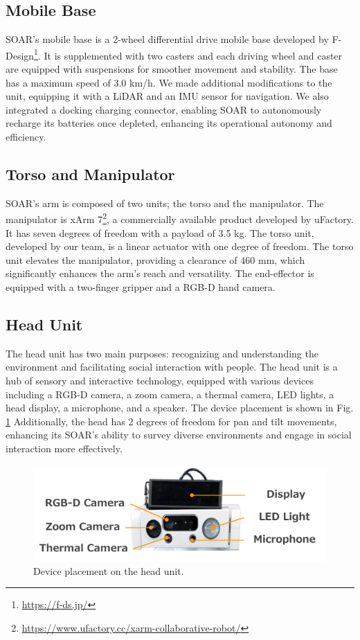 \documentclass[runningheads,a4paper]{llncs}
\begin{document}
\subsection{Mobile Base}
SOAR’s mobile base is a 2-wheel differential drive mobile base developed by F-Design\footnote{\url{https://f-ds.jp/}}.
It is supplemented with two casters and each driving wheel and caster are equipped with suspensions for smoother movement and stability.
The base has a maximum speed of 3.0 km/h.
We made additional modifications to the unit, equipping it with a LiDAR and an IMU sensor for navigation.
We also integrated a docking charging connector, enabling SOAR to autonomously recharge its batteries once depleted, enhancing its operational autonomy and efficiency.

\subsection{Torso and Manipulator}
SOAR’s arm is composed of two units; the torso and the manipulator.
The manipulator is xArm 7\footnote{\url{https://www.ufactory.cc/xarm-collaborative-robot/}}, a commercially available product developed by uFactory.
It has seven degrees of freedom with a payload of 3.5 kg.
The torso unit, developed by our team, is a linear actuator with one degree of freedom.
The torso unit elevates the manipulator, providing a clearance of 460 mm, which significantly enhances the arm’s reach and versatility.
The end-effector is equipped with a two-finger gripper and a RGB-D hand camera.

\subsection{Head Unit}
The head unit has two main purposes: recognizing and understanding the environment and facilitating social interaction with people.
The head unit is a hub of sensory and interactive technology, equipped with various devices including a RGB-D camera, a zoom camera, a thermal camera, LED lights, a head display, a microphone, and a speaker.
The device placement is shown in Fig. \ref{fig:head}
Additionally, the head has 2 degrees of freedom for pan and tilt movements, enhancing its SOAR’s ability to survey diverse environments and engage in social interaction more effectively.

\begin{figure}[tbp]
	\centering
	\includegraphics[width=1.0\linewidth]{images/head_unit.png}
	\caption{Device placement on the head unit.}
	\label{fig:head}
\end{figure}
\end{document}
